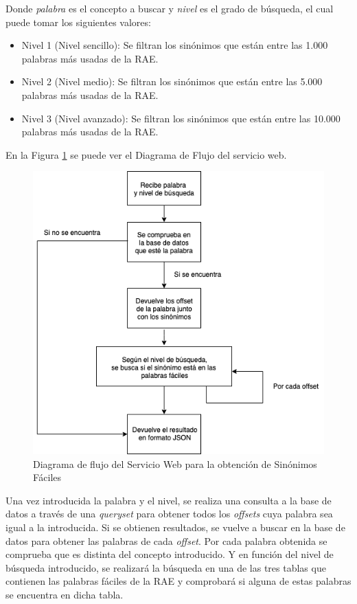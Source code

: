 Donde \textit{palabra} es el concepto a buscar y \textit{nivel} es el grado de búsqueda, el cual puede tomar los siguientes valores:
\begin{itemize}
	\item Nivel 1 (Nivel sencillo): Se filtran los sinónimos que están entre las 1.000 palabras más usadas de la RAE.
	\item Nivel 2 (Nivel medio): Se filtran los sinónimos que están entre las 5.000 palabras más usadas de la RAE.
	\item Nivel 3 (Nivel avanzado): Se filtran los sinónimos que están entre las 10.000 palabras más usadas de la RAE.
\end{itemize}
En la Figura \ref{fig:swsinonimos} se puede ver el Diagrama de Flujo del servicio web.

\begin{figure}[!h]
	\includegraphics[width=.9\textwidth]{Imagenes/Bitmap/Capitulo4/ServiciosWeb/DiagramaFlujoSinonimos.png}
	\centering
	\caption{Diagrama de flujo del Servicio Web para la obtención de Sinónimos Fáciles}
	\label{fig:swsinonimos}
\end{figure}
Una vez introducida la palabra y el nivel, se realiza una consulta a la base de datos a través de una \textit{queryset} para obtener todos los \textit{offsets} cuya palabra sea igual a la introducida.
Si se obtienen resultados, se vuelve a buscar en la base de datos para obtener las palabras de cada \textit{offset}. Por cada palabra obtenida  se comprueba que es distinta del concepto introducido. Y en función del nivel de búsqueda introducido, se realizará la búsqueda en una de las tres tablas que contienen las palabras fáciles de la RAE y comprobará si alguna de estas palabras se encuentra en dicha tabla.

